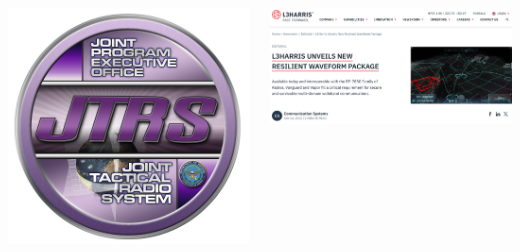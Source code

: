 \documentclass[
	11pt, %
]{beamer}
\begin{document}
\begin{frame}
  \begin{columns}[c] %
    \begin{column}{0.4\textwidth} %
      \begin{center}
        \includegraphics[width=1\linewidth]{jtrs_badge.jpeg}
      \end{center}
    \end{column}
    \begin{column}{0.7\textwidth} %
      \includegraphics[width=1\linewidth]{l3harris.png}
      \begin{center}
      \end{center}
    \end{column}
  \end{columns}
\end{frame}

\end{document}
